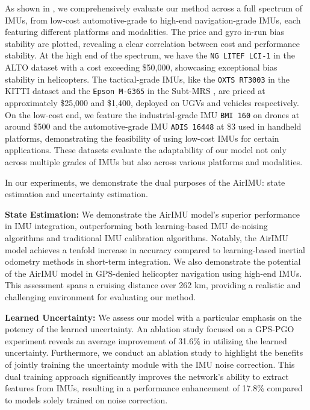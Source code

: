 As shown in , we comprehensively evaluate our method across a full spectrum of IMUs, from low-cost automotive-grade to high-end navigation-grade IMUs, each featuring different platforms and modalities. 
The price and gyro in-run bias stability are plotted, revealing a clear correlation between cost and performance stability.
At the high end of the spectrum, we have the \texttt{NG LITEF LCI-1} in the ALTO dataset \cite{cisneros2022alto} with a cost exceeding \$50,000, showcasing exceptional bias stability in helicopters.
The tactical-grade IMUs, like the \texttt{OXTS RT3003} in the KITTI dataset \cite{KITTIDataset} and the \texttt{Epson M-G365} in the Subt-MRS \cite{zhao2023subt}, are priced at approximately \$25,000 and \$1,400, deployed on UGVs and vehicles respectively.
On the low-cost end, we feature the industrial-grade IMU \texttt{BMI 160} on drones at around \$500 and the automotive-grade IMU \texttt{ADIS 16448} at \$3 used in handheld platforms, demonstrating the feasibility of using low-cost IMUs for certain applications.
These datasets evaluate the adaptability of our model not only across multiple grades of IMUs but also across various platforms and modalities.

In our experiments, we demonstrate the dual purposes of the AirIMU: state estimation and uncertainty estimation.

\textbf{State Estimation:}
We demonstrate the AirIMU model's superior performance in IMU integration, outperforming both learning-based IMU de-noising algorithms and traditional IMU calibration algorithms.
Notably, the AirIMU model achieves a tenfold increase in accuracy compared to learning-based inertial odometry methods in short-term integration.
We also demonstrate the potential of the AirIMU model in GPS-denied helicopter navigation using high-end IMUs. 
This assessment spans a cruising distance over 262 \si{\km}, providing a realistic and challenging environment for evaluating our method.

\textbf{Learned Uncertainty:}
We assess our model with a particular emphasis on the potency of the learned uncertainty.
An ablation study focused on a GPS-PGO experiment reveals an average improvement of 31.6\% in utilizing the learned uncertainty.
Furthermore, we conduct an ablation study to highlight the benefits of jointly training the uncertainty module with the IMU noise correction.
This dual training approach significantly improves the network's ability to extract features from IMUs, resulting in a performance enhancement of 17.8\% compared to models solely trained on noise correction.

